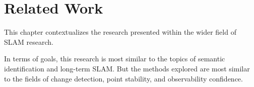 \section{Related Work}
\label{sec:related_work}

This chapter contextualizes the research presented within the wider field of SLAM research. 

In terms of goals, this research is most similar to the topics of semantic identification and long-term SLAM. But the methods explored are most similar to the fields of change detection, point stability, and observability confidence.

% 